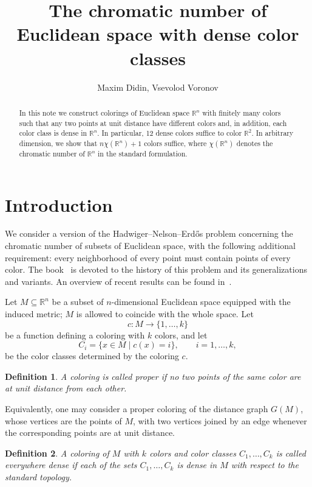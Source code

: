 \documentclass[12pt,a4paper]{article}
\title{The chromatic number of Euclidean space with dense color classes}
\author{Maxim Didin, Vsevolod Voronov}
\newtheorem{definition}{Definition}
\begin{document}
\maketitle

\begin{abstract}
In this note we construct colorings of Euclidean space
$\mathbb{R}^n$ with finitely many colors such that any two points at unit distance have different colors and, in addition, each color class is dense
in $\mathbb{R}^n$. In particular, 12 dense colors suffice to color $\mathbb{R}^2$. In arbitrary dimension, we show that
$n\chi(\mathbb{R}^n)+1$ colors suffice, where
$\chi(\mathbb{R}^n)$ denotes the chromatic number of $\mathbb{R}^n$ in the
standard formulation.
\end{abstract}


\section{Introduction}

We consider a version of the Hadwiger--Nelson--Erdős problem concerning
the chromatic number of subsets of Euclidean space, with the following
additional requirement: every neighborhood of every point must contain
points of every color. The book~\cite{Soifer} is devoted to the history of
this problem and its generalizations and variants. An overview of recent
results can be found in~\cite{arman2024upper,cherkashin2018chromatic}.

Let $M \subseteq \mathbb{R}^n$ be a subset of $n$-dimensional Euclidean
space equipped with the induced metric; $M$ is allowed to coincide with the
whole space. Let
\[
c\colon M\to\{1,\dots,k\}
\]
be a function defining a coloring with $k$ colors, and let
\[
C_i=\{x\in M\mid c(x)=i\},\qquad i=1,\dots,k,
\]
be the color classes determined by the coloring $c$.

\begin{definition}
A coloring is called proper if no two points of the same color are at unit
distance from each other.
\end{definition}

Equivalently, one may consider a proper coloring of the distance graph
$G(M)$, whose vertices are the points of $M$, with two vertices joined by an
edge whenever the corresponding points are at unit distance. 

\begin{definition}
A coloring of $M$ with $k$ colors and color classes
$C_1,\dots,C_k$ is called everywhere dense if each of the sets
$C_1,\dots,C_k$ is dense in $M$ with respect to the standard topology.
\end{definition}
\end{document}
